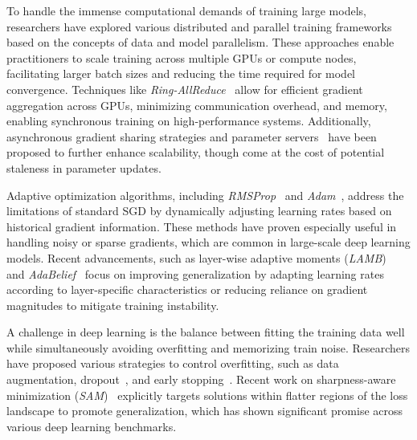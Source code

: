 
To handle the immense computational demands of training large models, researchers have explored various distributed and parallel training frameworks based on the concepts of data and model parallelism. These approaches enable practitioners to scale training across multiple GPUs or compute nodes, facilitating larger batch sizes and reducing the time required for model convergence. Techniques like \textit{Ring-AllReduce}~\cite{baidu2017ringallreduce} allow for efficient gradient aggregation across GPUs, minimizing communication overhead, and memory, enabling synchronous training on high-performance systems. Additionally, asynchronous gradient sharing strategies and parameter servers~\cite{dean2012large} have been proposed to further enhance scalability, though come at the cost of potential staleness in parameter updates.


Adaptive optimization algorithms, including \textit{RMSProp}~\cite{tieleman2012lecture} and \textit{Adam}~\cite{kingma2014adam}, address the limitations of standard SGD by dynamically adjusting learning rates based on historical gradient information. These methods have proven especially useful in handling noisy or sparse gradients, which are common in large-scale deep learning models. Recent advancements, such as layer-wise adaptive moments (\textit{LAMB})~\cite{you2020large} and \textit{AdaBelief}~\cite{zhuang2020adabelief} focus on improving generalization by adapting learning rates according to layer-specific characteristics or reducing reliance on gradient magnitudes to mitigate training instability.


A challenge in deep learning is the balance between fitting the training data well while simultaneously avoiding overfitting and memorizing train noise. Researchers have proposed various strategies to control overfitting, such as data augmentation, dropout~\cite{srivastava2014dropout}, and early stopping~\cite{prechelt1998early}. Recent work on sharpness-aware minimization (\textit{SAM})~\cite{foret2020sharpness} explicitly targets solutions within flatter regions of the loss landscape to promote generalization, which has shown significant promise across various deep learning benchmarks.

